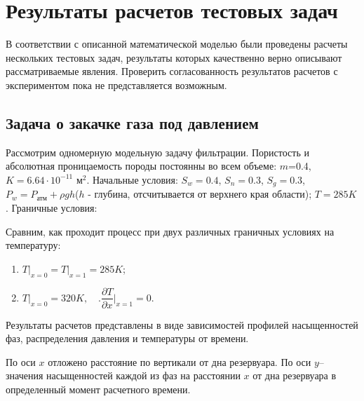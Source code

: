 %
\section{Результаты расчетов тестовых задач}
%
В соответствии с описанной математической моделью были проведены расчеты
нескольких тестовых задач, результаты которых качественно верно описывают
рассматриваемые явления. Проверить согласованность результатов расчетов с
экспериментом пока не представляется возможным.

\subsection{Задача о закачке газа под давлением}
Рассмотрим одномерную модельную задачу фильтрации. Пористость и
абсолютная проницаемость породы постоянны во всем объеме:  $m$=0.4,\; $K=6.64\cdot 10^{-11}$ м$^2$.
Начальные условия:\; $S_w=0.4$,\; $S_n=0.3$,\; $S_g=0.3$, 
$P_w=P_\text{атм}+\rho g h$($h$ - глубина, отсчитывается от верхнего края области);
$T=285K$. Граничные условия:

Сравним, как проходит процесс при двух различных граничных
условиях на температуру:
\begin{enumerate}
 \item \label{noT} $\left.T\right|_{x=0}=\left.T\right|_{x=1}=285K$;
 \item \label{T} $\left.T\right|_{x=0}=320K,\quad \Biggl.\dfrac{\partial{T}}{\partial{x}}\Biggr|_{x=1}=0$.
\end{enumerate}


Результаты расчетов представлены в виде зависимостей профилей насыщенностей фаз,
распределения давления и температуры от времени.

По оси $x$ отложено расстояние по вертикали от дна резервуара. По оси $y$--
значения насыщенностей каждой из фаз на расстоянии $x$ от дна резервуара
в определенный момент расчетного времени.

